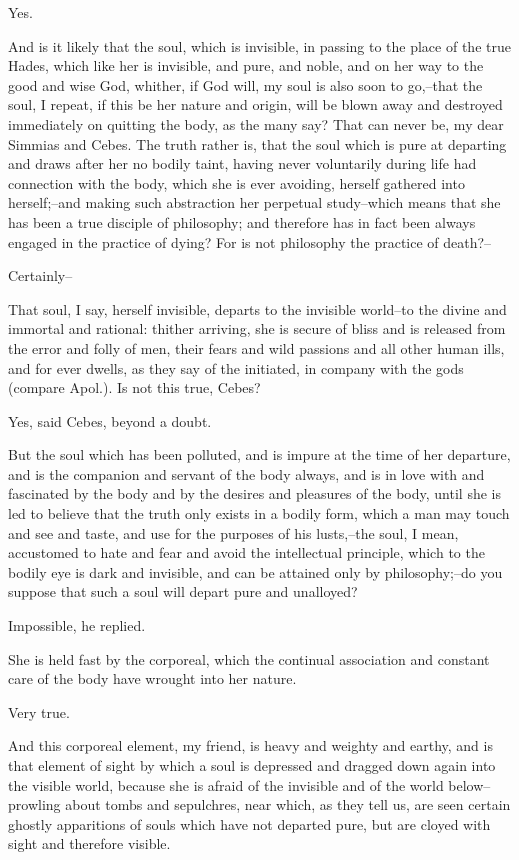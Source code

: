 Yes.

And is it likely that the soul, which is invisible, in passing to the
place of the true Hades, which like her is invisible, and pure, and
noble, and on her way to the good and wise God, whither, if God will, my
soul is also soon to go,--that the soul, I repeat, if this be her nature
and origin, will be blown away and destroyed immediately on quitting the
body, as the many say? That can never be, my dear Simmias and Cebes.
The truth rather is, that the soul which is pure at departing and draws
after her no bodily taint, having never voluntarily during life had
connection with the body, which she is ever avoiding, herself gathered
into herself;--and making such abstraction her perpetual study--which
means that she has been a true disciple of philosophy; and therefore
has in fact been always engaged in the practice of dying? For is not
philosophy the practice of death?--

Certainly--

That soul, I say, herself invisible, departs to the invisible world--to
the divine and immortal and rational: thither arriving, she is secure of
bliss and is released from the error and folly of men, their fears and
wild passions and all other human ills, and for ever dwells, as they say
of the initiated, in company with the gods (compare Apol.). Is not this
true, Cebes?

Yes, said Cebes, beyond a doubt.

But the soul which has been polluted, and is impure at the time of her
departure, and is the companion and servant of the body always, and is
in love with and fascinated by the body and by the desires and pleasures
of the body, until she is led to believe that the truth only exists in
a bodily form, which a man may touch and see and taste, and use for the
purposes of his lusts,--the soul, I mean, accustomed to hate and fear
and avoid the intellectual principle, which to the bodily eye is dark
and invisible, and can be attained only by philosophy;--do you suppose
that such a soul will depart pure and unalloyed?

Impossible, he replied.

She is held fast by the corporeal, which the continual association and
constant care of the body have wrought into her nature.

Very true.

And this corporeal element, my friend, is heavy and weighty and earthy,
and is that element of sight by which a soul is depressed and dragged
down again into the visible world, because she is afraid of the
invisible and of the world below--prowling about tombs and sepulchres,
near which, as they tell us, are seen certain ghostly apparitions
of souls which have not departed pure, but are cloyed with sight and
therefore visible.

